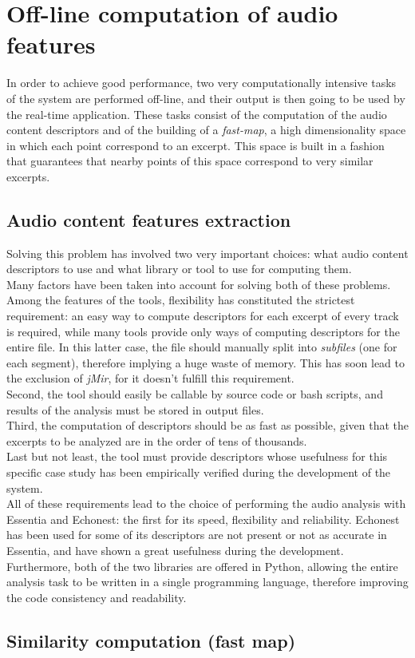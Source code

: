 \chapter{Off-line computation of audio features} %

\label{Chapter5} %

In order to achieve good performance, two very computationally intensive tasks of the system are performed off-line, and their output is then going to be used by the real-time application. These tasks consist of the computation of the audio content descriptors and of the building of a \textit{fast-map}, a high dimensionality space in which each point correspond to an excerpt. This space is built in a fashion that guarantees that nearby points of this space correspond to very similar excerpts.


\section{Audio content features extraction}
Solving this problem has involved two very important choices: what audio content descriptors to use and what library or tool to use for computing them. \\Many factors have been taken into account for solving both of these problems.\\ Among the features of the tools, flexibility has constituted the strictest requirement: an easy way to compute descriptors for each excerpt of every track is required, while many tools provide only ways of computing descriptors for the entire file. In this latter case, the file should manually split into \textit{subfiles} (one for each segment), therefore implying a huge waste of memory. This has soon lead to the exclusion of \textit{jMir}, for it doesn't fulfill this requirement. \\ 
Second, the tool should easily be callable by source code or bash scripts, and results of the analysis must be stored in output files. \\
Third, the computation of descriptors should be as fast as possible, given that the excerpts to be analyzed are in the order of tens of thousands. \\
Last but not least, the tool must provide descriptors whose usefulness for this specific case study has been empirically verified during the development of the system.\\
All of these requirements lead to the choice of performing the audio analysis with Essentia and Echonest: the first for its speed, flexibility and reliability. Echonest has been used for some of its descriptors are not present or not as accurate in Essentia, and have shown a great usefulness during the development. \\ Furthermore, both of the two libraries are offered in Python, allowing the entire analysis task to be written in a single programming language, therefore improving the code consistency and readability.


\section{Similarity computation (fast map)}